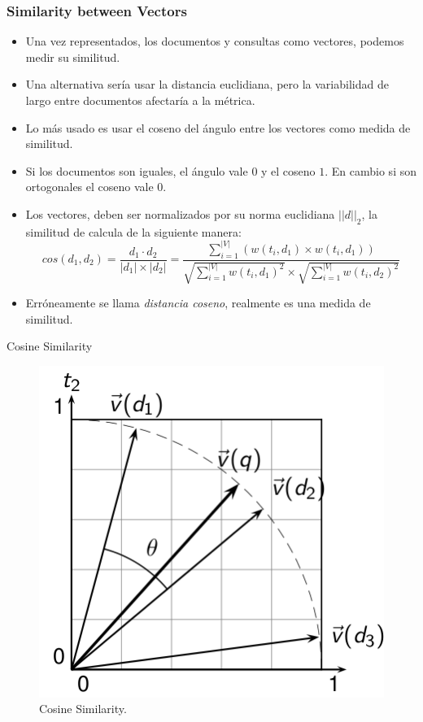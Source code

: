 \documentclass[handout]{beamer}
\begin{document}
\begin{frame}\frametitle{Similarity between Vectors}
\footnotesize{
\begin{itemize}
 \item Una vez representados, los documentos y consultas como vectores, podemos medir su similitud.
 \item Una alternativa sería usar la distancia euclidiana, pero la variabilidad de largo entre documentos afectaría a la métrica.
 \item Lo más usado es usar el coseno del ángulo entre los vectores como medida de similitud.
 \item Si los documentos son iguales, el ángulo vale $0$ y el coseno $1$. En cambio si son ortogonales el coseno vale $0$.
 \item Los vectores, deben ser normalizados por su norma euclidiana $||d||_{2}$, la similitud de calcula de la siguiente manera:  
 \begin{displaymath}
 cos(d_{1},d_{2})= \frac{d_{1}\cdot d_{2}}{|d_{1}|\times|d_{2}|} = \frac{\sum_{i=1}^{|V|}(w(t_{i},d_{1})\times w(t_{i},d_{1}))}{\sqrt{\sum_{i=1}^{|V|} w(t_{i},d_{1})^2}\times \sqrt{\sum_{i=1}^{|V|} w(t_{i},d_{2})^2}}
\end{displaymath}
\item Erróneamente se llama \emph{distancia coseno}, realmente es una medida de similitud.


\end{itemize}


}
\end{frame}

\begin{frame}{Cosine Similarity}

\begin{figure}[h!]
	\centering
	\includegraphics[scale=0.5]{pics/cos.png}
	\caption{ Cosine Similarity.}
\end{figure}

\end{frame}
\end{document}
